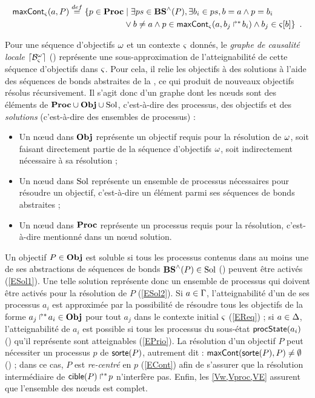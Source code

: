 \begin{definition}[$\gCont_\ctx : \Sigma \times \Obj \to \powerset(\PHproc)$]
  \begin{align*}
    \mathsf{maxCont}_\varsigma(a,P) \stackrel{def}=
    \{ p \in \mathbf{Proc} &\mid \exists ps \in \mathbf{BS}^\wedge(P), \exists b_i \in ps, b = a \wedge p = b_i \\
      & \vee b \neq a \wedge p \in \mathsf{maxCont}_\varsigma(a, \mbox{$b_j\Rsh^*\!b_i$}) \wedge b_j \in {\varsigma[b]} \}
    \enspace.
  \end{align*}
\end{definition}

Pour une séquence d'objectifs $\omega$ et un contexte $\varsigma$ donnés,
le \emph{graphe de causalité locale} $\lceil \mathcal{B}_\varsigma^\omega\rceil$ () représente une sous-approximation de
l'atteignabilité de cette séquence d'objectifs dans $\varsigma$.
Pour cela, il relie les objectifs à des solutions à
l'aide des séquences de bonds abstraites de la , ce qui produit de nouveaux objectifs
résolus récursivement.
Il s'agit donc d'un graphe dont les nœuds sont des éléments de $\mathbf{Proc} \cup \mathbf{Obj} \cup \mathrm{Sol}$,
c'est-à-dire des processus, des objectifs et des \emph{solutions}
(c'est-à-dire des ensembles de processus) :
\begin{itemize}
  \item Un nœud dans $\mathbf{Obj}$ représente un objectif requis pour la résolution de $\omega$,
    soit faisant directement partie de la séquence d'objectifs $\omega$,
    soit indirectement nécessaire à sa résolution ;
  \item Un nœud dans $\mathrm{Sol}$ représente un ensemble de processus nécessaires pour résoudre
    un objectif, c'est-à-dire un élément parmi ses séquences de bonds abstraites ;
  \item Un nœud dans $\mathbf{Proc}$ représente un processus requis pour la résolution,
    c'est-à-dire mentionné dans un nœud solution.
\end{itemize}

Un objectif $P \in \mathbf{Obj}$ est soluble si tous les processus contenus dans au moins une de ses
abstractions de séquences de bonds $\mathbf{BS}^\wedge(P) \in \mathrm{Sol}$ (\cf {})
peuvent être activés (\eqref{ESol1}).
Une telle solution représente donc un ensemble de processus qui doivent être activés
pour la résolution de $P$ (\eqref{ESol2}).
Si $a \in \Gamma$, l'atteignabilité d'un de ses processus $a_i$ est approximée par
la possibilité de résoudre tous les objectifs de la forme $\mbox{${a}_{j}\Rsh^*\!{a}_{i}$} \in \mathbf{Obj}$
pour tout $a_j$ dans le contexte initial $\varsigma$ (\eqref{EReq}) ;
si $a \in \Delta$, l'atteignabilité de $a_i$ est possible si tous les processus du sous-état
$\mathsf{procState}(a_i)$ (\cf {}) qu'il représente sont atteignables (\eqref{EPrio}).
La résolution d'un objectif $P$ peut nécessiter un processus $p$ de $\mathsf{sorte}(P)$,
autrement dit : $\mathsf{maxCont}(\mathsf{sorte}(P), P) \neq \emptyset$ (\cf {}) ;
dans ce cas, $P$ est \emph{re-centré} en $p$ (\eqref{ECont})
afin de s'assurer que la résolution intermédiaire de $\mbox{$\mathsf{cible}(P)\Rsh^*\!p$}$ n'interfère pas.
Enfin, les \eqref{Vw,Vproc,VE} assurent que l'ensemble des nœuds est complet.

